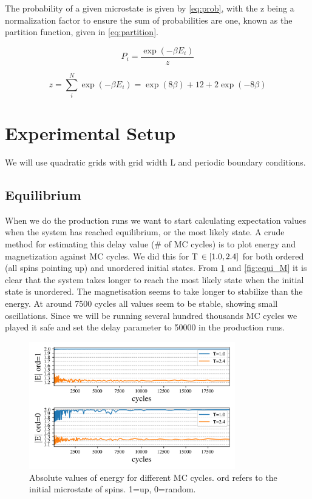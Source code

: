 The probability of a given microstate is given by \cref{eq:prob}, with
the z being a normalization factor to ensure the sum of probabilities are one,
known as the partition function, given in \cref{eq:partition}.


\begin{equation}
  \label{eq:prob}
  P_i = \frac{\exp(-\beta E_i)}{z}
\end{equation}

\begin{equation}
  \label{eq:partition}
  z = \sum_{i}^{N} \exp(-\beta E_i) = \exp(8\beta) + 12 + 2\exp(-8\beta)
\end{equation}


\section{Experimental Setup}
We will
use quadratic grids with grid width L and periodic
boundary conditions.


\subsection{Equilibrium}

When we do the production runs we want to start calculating expectation values
when the system has reached equilibrium, or the most likely state. A crude
method for estimating this delay value (\# of MC cycles) is to plot energy and
magnetization against MC cycles. We did this for T $\in \left[1.0,2.4\right]$ for both
ordered (all spins pointing up) and unordered initial states. From
\cref{fig:equi_E} and \cref{fig:equi_M} it is clear that the system takes longer
to reach the most likely state when the initial state is unordered. The
magnetisation seems to take longer to stabilize than the energy. At around 7500
cycles all values seem to be stable, showing small oscillations. Since we will
be running several hundred thousands MC cycles we played it safe and set the
delay parameter to 50000 in the production runs.

\begin{figure}[H]
  \centering
  \includegraphics[width=0.8\textwidth]{../figures/equilibrium_E.png}
  \caption{Absolute values of energy for different MC cycles.
  ord refers to the initial microstate of spins. 1=up, 0=random.}
  \label{fig:equi_E}
\end{figure}


